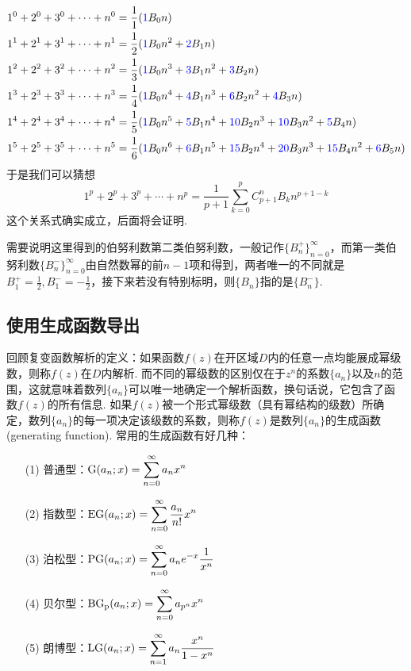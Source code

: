 \documentclass[main.tex]{subfiles}
\begin{document}
\begin{align*}
    1^0+2^0+3^0+ \cdots +n^0 &= \frac{1}{1}({\color{blue}1}B_0n) \\
    1^1+2^1+3^1+ \cdots +n^1 &= \frac{1}{2}({\color{blue}1}B_0n^2+{\color{blue}2}B_1n) \\
    1^2+2^2+3^2+ \cdots +n^2 &= \frac{1}{3}({\color{blue}1}B_0n^3+{\color{blue}3}B_1n^2+{\color{blue}3}B_2n) \\
    1^3+2^3+3^3+ \cdots +n^3 &= \frac{1}{4}({\color{blue}1}B_0n^4+{\color{blue}4}B_1n^3+{\color{blue}6}B_2n^2+{\color{blue}4}B_3n) \\
    1^4+2^4+3^4+ \cdots +n^4 &= \frac{1}{5}({\color{blue}1}B_0n^5+{\color{blue}5}B_1n^4+{\color{blue}10}B_2n^3+{\color{blue}10}B_3n^2+{\color{blue}5}B_4n) \\
    1^5+2^5+3^5+ \cdots +n^5 &= \frac{1}{6}({\color{blue}1}B_0n^6+{\color{blue}6}B_1n^5+{\color{blue}15}B_2n^4+{\color{blue}20}B_3n^3+{\color{blue}15}B_4n^2+{\color{blue}6}B_5n)
\end{align*}
于是我们可以猜想
\[1^p+2^p+3^p+ \cdots +n^p = \frac{1}{p+1}\sum_{k=0}^{p}C_{p+1}^{n}B_kn^{p+1-k}\]
这个关系式确实成立，后面将会证明.

需要说明这里得到的伯努利数第二类伯努利数，一般记作\(\{B_{n}^+\}_{n=0}^{\infty}\)，而第一类伯努利数\(\{B_n^-\}_{n=0}^{\infty}\)由自然数幂的前\(n-1\)项和得到，两者唯一的不同就是\(\displaystyle{B_1^+ = \frac{1}{2}, B_1^- = -\frac{1}{2}}\)，接下来若没有特别标明，则\(\{B_n\}\)指的是\(\{B_n^-\}\).

\subsection{使用生成函数导出}

回顾复变函数解析的定义：如果函数\(f(z)\)在开区域\(D\)内的任意一点均能展成幂级数，则称\(f(z)\)在\(D\)内解析. 而不同的幂级数的区别仅在于\(z^n\)的系数\(\{a_n\}\)以及\(n\)的范围，这就意味着数列\(\{a_n\}\)可以唯一地确定一个解析函数，换句话说，它包含了函数\(f(z)\)的所有信息. 如果\(f(z)\)被一个形式幂级数（具有幂结构的级数）所确定，数列\(\{a_n\}\)的每一项决定该级数的系数，则称\(f(z)\)是数列\(\{a_n\}\)的生成函数(generating function). 常用的生成函数有好几种：
\begin{itemize}
    \item[(1)] 普通型：\(\displaystyle{{\rm G}(a_n;x) = \sum_{n=0}^{\infty}a_nx^n}\)
    \item[(2)] 指数型：\(\displaystyle{{\rm EG}(a_n;x) = \sum_{n=0}^{\infty}\frac{a_n}{n!}x^n}\)
    \item[(3)] 泊松型：\(\displaystyle{{\rm PG}(a_n;x) = \sum_{n=0}^{\infty} a_ne^{-x}\frac{1}{x^n}}\) 
    \item[(4)] 贝尔型：\(\displaystyle{{\rm BG_p}(a_n;x) = \sum_{n=0}^{\infty} a_{p^n}x^n}\) 
    \item[(5)] 朗博型：\(\displaystyle{{\rm LG}(a_n;x) = \sum_{n=1}^{\infty}a_n\frac{x^n}{1-x^n}}\)
\end{itemize}
\end{document}
